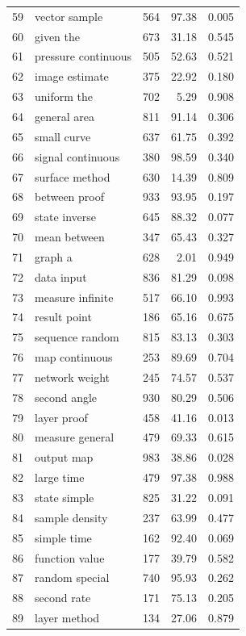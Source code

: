\documentclass[11pt]{article}
\begin{document}
\begin{longtable}{rlrrr}
  59 & vector sample & 564 & 97.38 & 0.005 \\
  60 & given the & 673 & 31.18 & 0.545 \\
  61 & pressure continuous & 505 & 52.63 & 0.521 \\
  62 & image estimate & 375 & 22.92 & 0.180 \\
  63 & uniform the & 702 & 5.29 & 0.908 \\
  64 & general area & 811 & 91.14 & 0.306 \\
  65 & small curve & 637 & 61.75 & 0.392 \\
  66 & signal continuous & 380 & 98.59 & 0.340 \\
  67 & surface method & 630 & 14.39 & 0.809 \\
  68 & between proof & 933 & 93.95 & 0.197 \\
  69 & state inverse & 645 & 88.32 & 0.077 \\
  70 & mean between & 347 & 65.43 & 0.327 \\
  71 & graph a & 628 & 2.01 & 0.949 \\
  72 & data input & 836 & 81.29 & 0.098 \\
  73 & measure infinite & 517 & 66.10 & 0.993 \\
  74 & result point & 186 & 65.16 & 0.675 \\
  75 & sequence random & 815 & 83.13 & 0.303 \\
  76 & map continuous & 253 & 89.69 & 0.704 \\
  77 & network weight & 245 & 74.57 & 0.537 \\
  78 & second angle & 930 & 80.29 & 0.506 \\
  79 & layer proof & 458 & 41.16 & 0.013 \\
  80 & measure general & 479 & 69.33 & 0.615 \\
  81 & output map & 983 & 38.86 & 0.028 \\
  82 & large time & 479 & 97.38 & 0.988 \\
  83 & state simple & 825 & 31.22 & 0.091 \\
  84 & sample density & 237 & 63.99 & 0.477 \\
  85 & simple time & 162 & 92.40 & 0.069 \\
  86 & function value & 177 & 39.79 & 0.582 \\
  87 & random special & 740 & 95.93 & 0.262 \\
  88 & second rate & 171 & 75.13 & 0.205 \\
  89 & layer method & 134 & 27.06 & 0.879 \\

\end{longtable}
\end{document}
